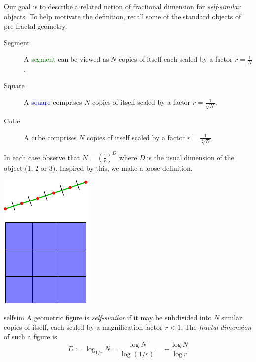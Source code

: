 Our goal is to describe a related notion of fractional dimension for \emph{self-similar} objects. To help motivate the definition, recall some of the standard objects of pre-fractal geometry.\par
\begin{minipage}[t]{0.75\linewidth}\vspace{-3pt}
	\begin{description}
		\item[Segment] A \textcolor{Green}{segment} can be viewed as $N$ copies of itself each scaled by a factor $r=\frac 1N$.
		\item[Square] A \textcolor{blue}{square} comprises $N$ copies of itself scaled by a factor $r=\frac 1{\sqrt N}$.
		\item[Cube] A cube comprises $N$ copies of itself scaled by a factor $r=\frac 1{\sqrt[3]{N}}$.
	\end{description}\vspace{-5pt}
	In each case observe that $N=\left(\frac 1r\right)^D$ where $D$ is the usual dimension of the object (1, 2 or 3). Inspired by this, we make a loose definition.
\end{minipage}
\hfill
\begin{minipage}[t]{0.24\linewidth}\vspace{-12pt}
	\flushright\includegraphics[scale=0.95]{self-sim-line}
\end{minipage}


\begin{defn}{}{selfsim}
	A geometric figure is \emph{self-similar} if it may be subdivided into $N$ similar copies of itself, each scaled by a magnification factor $r<1$. The \emph{fractal dimension} of such a figure is
	\[
		D:=\log_{1/r}N=\frac{\log N}{\log (1/r)}=-\frac{\log N}{\log r}
	\]
\end{defn}


